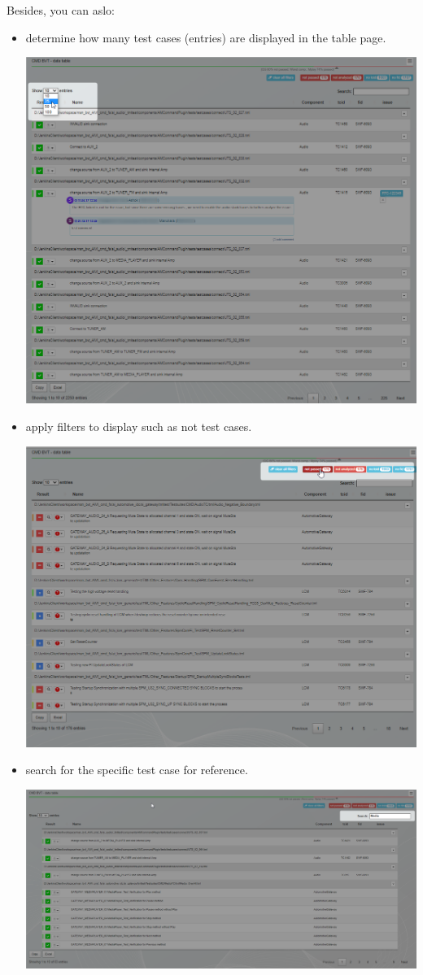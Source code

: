 Besides, you can aslo:
\begin{itemize}
   \item determine how many test cases (entries) are displayed in the table page.

         \includegraphics[width=0.6\linewidth]
         {./pictures/datatable/change_number_entries.png}
         
   \item apply filters to display such as not  test cases.
   
         \includegraphics[width=0.6\linewidth]
         {./pictures/datatable/apply_filter.png}

   \item search for the specific test case for reference.
   
         \includegraphics[width=0.6\linewidth]{./pictures/datatable/search.png}


\end{itemize}
